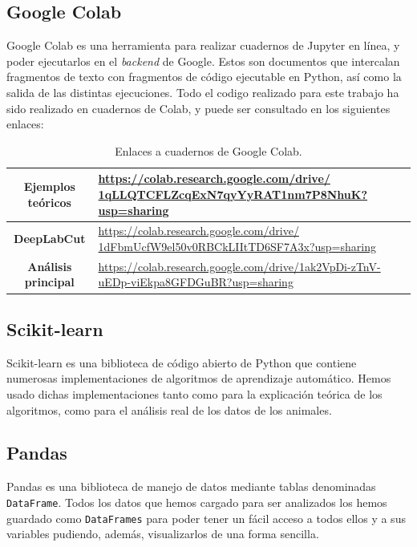 \subsection*{Google Colab}
Google Colab es una herramienta para realizar cuadernos de Jupyter en línea, y poder ejecutarlos en el \textit{backend} de Google. Estos son documentos que intercalan fragmentos de texto con fragmentos de código ejecutable en Python, así como la salida de las distintas ejecuciones. Todo el codigo realizado para este trabajo ha sido realizado en cuadernos de Colab, y puede ser consultado en los siguientes enlaces:

\begin{table}[h]
    \centering
    \begin{tabular}{|c|p{10cm}|}
        \hline
        \textbf{Ejemplos teóricos} & \href{https://colab.research.google.com/drive/1qLLQTCFLZcqExN7qyYyRAT1nm7P8NhuK?usp=sharing}{https://colab.research.google.com/drive/
        1qLLQTCFLZcqExN7qyYyRAT1nm7P8NhuK?usp=sharing} \\
        \hline
        \textbf{DeepLabCut} & \href{https://colab.research.google.com/drive/1dFbmUcfW9el50v0RBCkLIItTD6SF7A3x?usp=sharing}{https://colab.research.google.com/drive/
        1dFbmUcfW9el50v0RBCkLIItTD6SF7A3x?usp=sharing} \\
        \hline
        \textbf{Análisis principal} & \href{https://colab.research.google.com/drive/1ak2VpDi-zTnV-uEDp-viEkpa8GFDGuBR?usp=sharing}{https://colab.research.google.com/drive/1ak2VpDi-zTnV-uEDp-viEkpa8GFDGuBR?usp=sharing} \\
        \hline
    \end{tabular}
    \caption{Enlaces a cuadernos de Google Colab.}
    \label{tab:colab-links}
\end{table}

\subsection*{Scikit-learn}
Scikit-learn \cite{scikit-learn} es una biblioteca de código abierto de Python que contiene numerosas implementaciones de algoritmos de aprendizaje automático. Hemos usado dichas implementaciones tanto como para la explicación teórica de los algoritmos, como para el análisis real de los datos de los animales.

\subsection*{Pandas}
Pandas es una biblioteca de manejo de datos mediante tablas denominadas \texttt{DataFrame}. Todos los datos que hemos cargado para ser analizados los hemos guardado como \texttt{DataFrames} para poder tener un fácil acceso a todos ellos y a sus variables pudiendo, además, visualizarlos de una forma sencilla.

